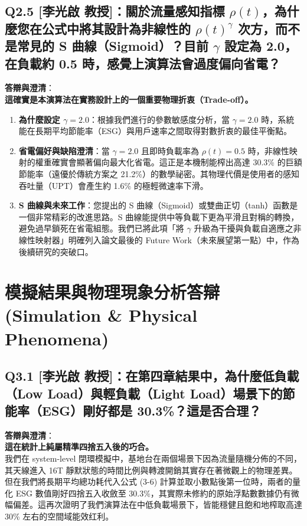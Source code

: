 \subsection*{Q2.5 [李光啟 教授]：關於流量感知指標 $\rho(t)$，為什麼您在公式中將其設計為非線性的 $\rho(t)^{\gamma}$ 次方，而不是常見的 S 曲線（Sigmoid）？目前 $\gamma$ 設定為 2.0，在負載約 0.5 時，感覺上演算法會過度偏向省電？}
\textbf{答辯與澄清}：\\
\textbf{這確實是本演算法在實務設計上的一個重要物理折衷（Trade-off）。}\\
\begin{enumerate}
    \item \textbf{為什麼設定 $\gamma = 2.0$}：根據我們進行的參數敏感度分析，當 $\gamma = 2.0$ 時，系統能在長期平均節能率（ESG）與用戶速率之間取得對數折衷的最佳平衡點。
    \item \textbf{省電偏好與缺陷澄清}：當 $\gamma = 2.0$ 且即時負載率為 $\rho(t) = 0.5$ 時，非線性映射的權重確實會顯著偏向最大化省電。這正是本機制能榨出高達 30.3\% 的巨額節能率（遠優於傳統方案之 21.2\%）的數學祕密。其物理代價是使用者的感知吞吐量（UPT）會產生約 1.6\% 的極輕微速率下滑。
    \item \textbf{S 曲線與未來工作}：您提出的 S 曲線（Sigmoid）或雙曲正切（tanh）函數是一個非常精彩的改進思路。S 曲線能提供中等負載下更為平滑且對稱的轉換，避免過早鎖死在省電組態。我們已將此項「將 $\gamma$ 升級為干擾與負載自適應之非線性映射器」明確列入論文最後的 Future Work（未來展望第一點）中，作為後續研究的突破口。
\end{enumerate}

\section{模擬結果與物理現象分析答辯 (Simulation \& Physical Phenomena)}

\subsection*{Q3.1 [李光啟 教授]：在第四章結果中，為什麼低負載（Low Load）與輕負載（Light Load）場景下的節能率（ESG）剛好都是 30.3\%？這是否合理？}
\textbf{答辯與澄清}：\\
\textbf{這在統計上純屬精準四捨五入後的巧合。}\\
我們在 system-level 閉環模擬中，基地台在兩個場景下因為流量隨機分佈的不同，其天線進入 16T 靜默狀態的時間比例與轉渡開銷其實存在著微觀上的物理差異。但在我們將長期平均總功耗代入公式 (3-6) 計算並取小數點後第一位時，兩者的量化 ESG 數值剛好四捨五入收斂至 30.3\%，其實際未修約的原始浮點數數據仍有微幅偏差。這再次證明了我們演算法在中低負載場景下，皆能穩健且飽和地榨取高達 30\% 左右的空間域能效红利。

